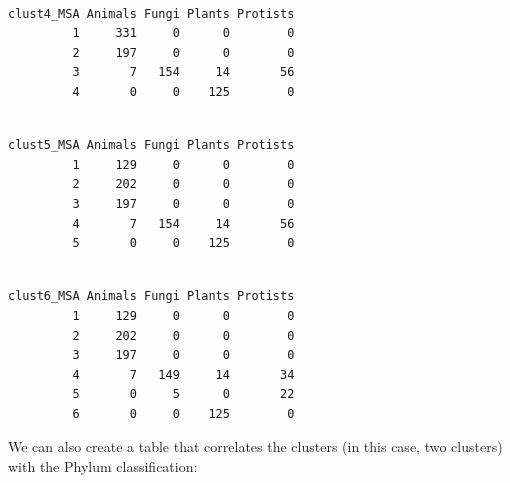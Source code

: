 \documentclass[
  letterpaper,
  DIV=11,
  numbers=noendperiod]{scrreprt}
\newenvironment{Shaded}{}{}
\newcommand{\DecValTok}[1]{\textcolor[rgb]{0.82,0.60,0.40}{#1}}
\newcommand{\FunctionTok}[1]{\textcolor[rgb]{0.38,0.69,0.94}{#1}}
\newcommand{\NormalTok}[1]{\textcolor[rgb]{0.67,0.70,0.75}{#1}}
\newcommand{\OtherTok}[1]{\textcolor[rgb]{0.15,0.68,0.38}{#1}}
\newcommand{\SpecialCharTok}[1]{\textcolor[rgb]{0.34,0.71,0.76}{#1}}
\begin{document}
\begin{verbatim}
          
clust4_MSA Animals Fungi Plants Protists
         1     331     0      0        0
         2     197     0      0        0
         3       7   154     14       56
         4       0     0    125        0
\end{verbatim}

\begin{Shaded}
\end{Shaded}

\begin{verbatim}
          
clust5_MSA Animals Fungi Plants Protists
         1     129     0      0        0
         2     202     0      0        0
         3     197     0      0        0
         4       7   154     14       56
         5       0     0    125        0
\end{verbatim}

\begin{Shaded}
\end{Shaded}

\begin{verbatim}
          
clust6_MSA Animals Fungi Plants Protists
         1     129     0      0        0
         2     202     0      0        0
         3     197     0      0        0
         4       7   149     14       34
         5       0     5      0       22
         6       0     0    125        0
\end{verbatim}

We can also create a table that correlates the clusters (in this case,
two clusters) with the Phylum classification:
\end{document}
